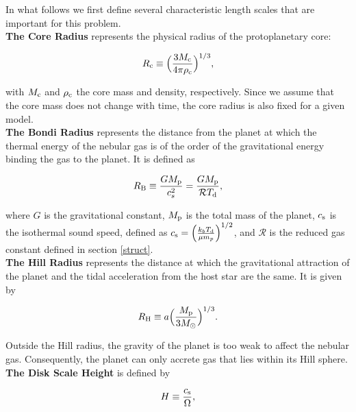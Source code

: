 \documentclass[apj]{emulateapj}
\newcommand{\co}{_{\rm c}}
\newcommand{\di}{_{\rm d}}
\begin{document}
In what follows we first define several characteristic length scales that are important for this problem. \\

\textbf{The Core Radius} represents the physical radius of the protoplanetary core:

\begin{equation}
\label{eq:rc}
R\co \equiv \Big(\frac{3 M\co}{4 \pi \rho\co}\Big)^{1/3},
\end{equation}

\noindent with $M\co$ and $\rho\co$ the core mass and density, respectively. Since we assume that the core mass does not change with time, the core radius is also fixed for a given model. \\

\textbf{The Bondi Radius} represents the distance from the planet at which the thermal energy of the nebular gas is of the order of the gravitational energy binding the gas to the planet. It is defined as

\begin{equation}
\label{eq:RB}
R_{\rm B} \equiv \frac{G M_{\rm p}}{c_s^2}=\frac{G M_{\rm p}}{\mathcal{R} T\di},
\end{equation}

\noindent where $G$ is the gravitational constant, $M_{\rm p}$ is the total mass of the planet, $c_{\rm s}$ is the isothermal sound speed, defined as $c_{\rm s}=\Big(\frac{k_b T\di}{\mu m_p}\Big)^{1/2}$, and $\mathcal{R}$ is the reduced gas constant defined in section \ref{struct}.\\


\textbf{The Hill Radius} represents the distance at which the gravitational attraction of the planet and the tidal acceleration from the host star are the same. It is given by

\begin{equation}
\label{eq:RHill}
R_{\rm H} \equiv a \Big(\frac{M_{\rm p}}{3 M_{\odot}}\Big)^{1/3}.
\end{equation}

\noindent Outside the Hill radius, the gravity of the planet is too weak to affect the nebular gas. Consequently, the planet can only accrete gas that lies within its Hill sphere. \\

\textbf{The Disk Scale Height} is defined by

\begin{equation}
\label{eq:H}
H \equiv \frac{c_{\rm s}}{\Omega},
\end{equation}
\end{document}
